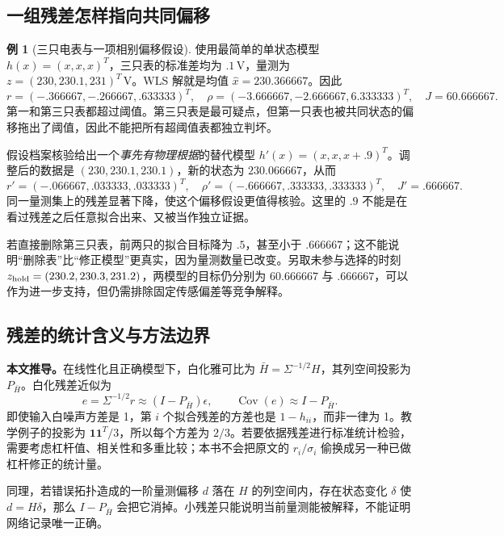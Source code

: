 \documentclass[UTF8,11pt,fontset=fandol,openany,oneside]{ctexbook}
\theoremstyle{definition}
\newtheorem{example}[theorem]{例}
\theoremstyle{remark}
\numberwithin{equation}{chapter}
\begin{document}
\subsection{一组残差怎样指向共同偏移}

\begin{example}[三只电表与一项相别偏移假设]
使用最简单的单状态模型 $h(x)=(x,x,x)^T$，三只表的标准差均为 $.1\,\mathrm V$，量测为
$z=(230,230.1,231)^T\,\mathrm V$。WLS 解就是均值
$\hat x=230.366667$。因此
\[
 r=(-.366667,-.266667,.633333)^T,\quad
 \rho=(-3.666667,-2.666667,6.333333)^T,
 \quad J=60.666667.
\]
第一和第三只表都超过阈值。第三只表是最可疑点，但第一只表也被共同状态的偏移拖出了阈值，因此不能把所有超阈值表都独立判坏。

假设档案核验给出一个\emph{事先有物理根据}的替代模型
$h'(x)=(x,x,x+.9)^T$。调整后的数据是
$(230,230.1,230.1)$，新的状态为 $230.066667$，从而
\[
 r'=(-.066667,.033333,.033333)^T,\quad
 \rho'=(-.666667,.333333,.333333)^T,\quad J'=.666667.
\]
同一量测集上的残差显著下降，使这个偏移假设更值得核验。这里的 $.9$ 不能是在看过残差之后任意拟合出来、又被当作独立证据。

若直接删除第三只表，前两只的拟合目标降为 $.5$，甚至小于 $.666667$；这不能说明“删除表”比“修正模型”更真实，因为量测数量已改变。另取未参与选择的时刻
$z_{\rm hold}=(230.2,230.3,231.2)$，两模型的目标仍分别为 $60.666667$ 与 $.666667$，可以作为进一步支持，但仍需排除固定传感偏差等竞争解释。
\end{example}

\subsection{残差的统计含义与方法边界}

\textbf{本文推导。}在线性化且正确模型下，白化雅可比为
$\bar H=\Sigma^{-1/2}H$，其列空间投影为 $P_{\bar H}$。白化残差近似为
\begin{equation}
 e=\Sigma^{-1/2}r\approx(I-P_{\bar H})\epsilon,
 \qquad \operatorname{Cov}(e)\approx I-P_{\bar H}.
 \label{eq:dq_s9_leverage}
\end{equation}
即使输入白噪声方差是 1，第 $i$ 个拟合残差的方差也是 $1-h_{ii}$，而非一律为 1。教学例子的投影为 $\boldsymbol1\boldsymbol1^T/3$，所以每个方差为 $2/3$。若要依据残差进行标准统计检验，需要考虑杠杆值、相关性和多重比较；本书不会把原文的 $r_i/\sigma_i$ 偷换成另一种已做杠杆修正的统计量。

同理，若错误拓扑造成的一阶量测偏移 $d$ 落在 $H$ 的列空间内，存在状态变化 $\delta$ 使 $d=H\delta$，那么 $I-P_{\bar H}$ 会把它消掉。小残差只能说明当前量测能被解释，不能证明网络记录唯一正确。
\end{document}
